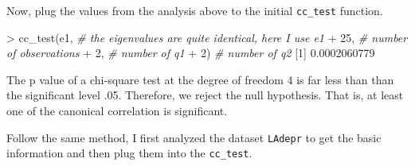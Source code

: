 \documentclass[
]{article}
\newenvironment{Shaded}{\begin{snugshade}}{\end{snugshade}}
\newcommand{\CommentTok}[1]{\textcolor[rgb]{0.56,0.35,0.01}{\textit{#1}}}
\newcommand{\DecValTok}[1]{\textcolor[rgb]{0.00,0.00,0.81}{#1}}
\newcommand{\FloatTok}[1]{\textcolor[rgb]{0.00,0.00,0.81}{#1}}
\newcommand{\FunctionTok}[1]{\textcolor[rgb]{0.00,0.00,0.00}{#1}}
\newcommand{\NormalTok}[1]{#1}
\newcommand{\SpecialCharTok}[1]{\textcolor[rgb]{0.00,0.00,0.00}{#1}}
\begin{document}
Now, plug the values from the analysis above to the initial
\texttt{cc\_test} function.

\begin{Shaded}
\begin{Highlighting}[]
\SpecialCharTok{\textgreater{}} \FunctionTok{cc\_test}\NormalTok{(e1, }\CommentTok{\# the eigenvalues are quite identical, here I use e1}
\SpecialCharTok{+}         \DecValTok{25}\NormalTok{, }\CommentTok{\# number of observations}
\SpecialCharTok{+}         \DecValTok{2}\NormalTok{, }\CommentTok{\# number of q1}
\SpecialCharTok{+}         \DecValTok{2}\NormalTok{) }\CommentTok{\# number of q2}
\NormalTok{[}\DecValTok{1}\NormalTok{] }\FloatTok{0.0002060779}
\end{Highlighting}
\end{Shaded}

The p value of a chi-square test at the degree of freedom 4 is far less
than than the significant level .05. Therefore, we reject the null
hypothesis. That is, at least one of the canonical correlation is
significant.

Follow the same method, I first analyzed the dataset \texttt{LAdepr} to
get the basic information and then plug them into the \texttt{cc\_test}.
\end{document}
